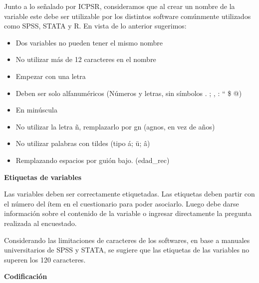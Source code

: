 \documentclass[
  spanish,
  a4paper,
  oneside]{scrbook}
\begin{document}
Junto a lo señalado por ICPSR, consideramos que al crear un nombre de la
variable este debe ser utilizable por los distintos software comúnmente
utilizados como SPSS, STATA y R. En vista de lo anterior sugerimos:

\begin{itemize}
\item
  Dos variables no pueden tener el mismo nombre
\item
  No utilizar más de 12 caracteres en el nombre
\item
  Empezar con una letra
\item
  Deben ser solo alfanuméricos (Números y letras, sin símbolos . ; , :
  `` \$ @)
\item
  En minúscula
\item
  No utilizar la letra ñ, remplazarlo por gn (agnos, en vez de años)
\item
  No utilizar palabras con tildes (tipo á; ü; â)
\item
  Remplazando espacios por guión bajo. (edad\_rec)
\end{itemize}

\textbf{Etiquetas de variables}

Las variables deben ser correctamente etiquetadas. Las etiquetas deben
partir con el número del ítem en el cuestionario para poder asociarlo.
Luego debe darse información sobre el contenido de la variable o
ingresar directamente la pregunta realizada al encuestado.

Considerando las limitaciones de caracteres de los softwares, en base a
manuales universitarios de SPSS y STATA, se sugiere que las etiquetas de
las variables no superen los 120 caracteres.

\textbf{Codificación}
\end{document}
